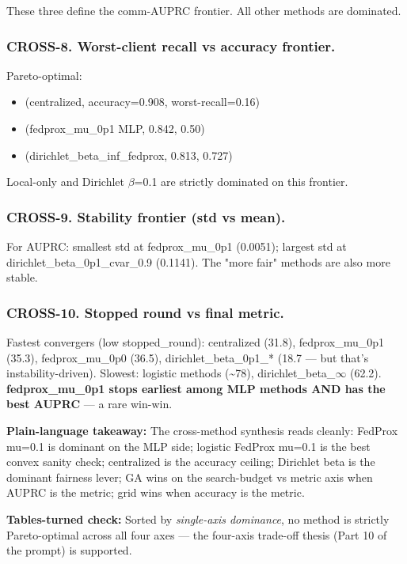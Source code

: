\documentclass{article}
\begin{document}
These three define the comm-AUPRC frontier. All other methods are dominated.


\subsubsection{CROSS-8. Worst-client recall vs accuracy frontier.}


Pareto-optimal:

\begin{itemize}[leftmargin=1.4em,itemsep=2pt,topsep=2pt]
  \item (centralized, accuracy=0.908, worst-recall=0.16)
  \item (fedprox\_mu\_0p1 MLP, 0.842, 0.50)
  \item (dirichlet\_beta\_inf\_fedprox, 0.813, 0.727)
\end{itemize}


Local-only and Dirichlet \ensuremath{\beta}=0.1 are strictly dominated on this frontier.


\subsubsection{CROSS-9. Stability frontier (std vs mean).}


For AUPRC: smallest std at fedprox\_mu\_0p1 (0.0051); largest std at dirichlet\_beta\_0p1\_cvar\_0.9 (0.1141). The "more fair" methods are also more stable.


\subsubsection{CROSS-10. Stopped round vs final metric.}


Fastest convergers (low stopped\_round): centralized (31.8), fedprox\_mu\_0p1 (35.3), fedprox\_mu\_0p0 (36.5), dirichlet\_beta\_0p1\_* (18.7 --- but that's instability-driven). Slowest: logistic methods (\textasciitilde{}78), dirichlet\_beta\_\ensuremath{\infty} (62.2). \textbf{fedprox\_mu\_0p1 stops earliest among MLP methods AND has the best AUPRC} --- a rare win-win.


\textbf{Plain-language takeaway:} The cross-method synthesis reads cleanly: FedProx mu=0.1 is dominant on the MLP side; logistic FedProx mu=0.1 is the best convex sanity check; centralized is the accuracy ceiling; Dirichlet beta is the dominant fairness lever; GA wins on the search-budget vs metric axis when AUPRC is the metric; grid wins when accuracy is the metric.


\textbf{Tables-turned check:} Sorted by \emph{single-axis dominance}, no method is strictly Pareto-optimal across all four axes --- the four-axis trade-off thesis (Part 10 of the prompt) is supported.
\end{document}
